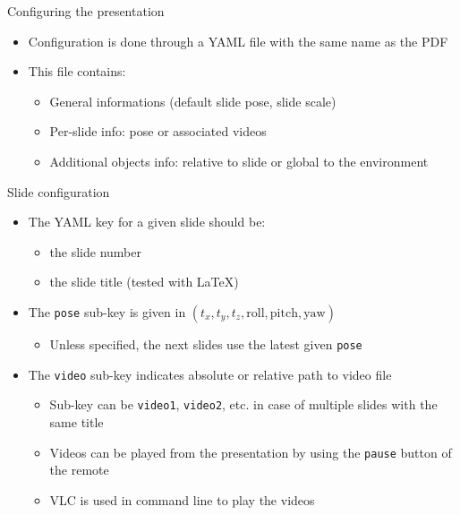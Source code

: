 \documentclass{ecnbeamer}
\begin{document}
\begin{frame}{Configuring the presentation}
 \begin{itemize}
  \item Configuration is done through a YAML file with the same name as the PDF\vfill
  \item This file contains:\vfill
  \begin{itemize}[<+->]
   \item General informations (default slide pose, slide scale)\vfill
   \item Per-slide info: pose or associated videos\vfill
   \item Additional objects info: relative to slide or global to the environment
  \end{itemize}
 \end{itemize}
\end{frame}

\begin{frame}{Slide configuration}
 \begin{itemize}
  \item The YAML key for a given slide should be:
  \begin{itemize}
   \item the slide number
   \item the slide title (tested with LaTeX)
  \end{itemize}\vfill
  \item The \texttt{pose} sub-key is given in $(t_x, t_y, t_z, \text{roll}, \text{pitch}, \text{yaw})$
  \begin{itemize}
   \item Unless specified, the next slides use the latest given \texttt{pose}
  \end{itemize}\vfill
  \item The \texttt{video} sub-key indicates absolute or relative path to video file
  \begin{itemize}
   \item Sub-key can be \texttt{video1}, \texttt{video2}, etc. in case of multiple slides with the same title
   \item Videos can be played from the presentation by using the \texttt{pause} button of the remote
   \item VLC is used in command line to play the videos
  \end{itemize}
 \end{itemize}
\end{frame}
\end{document}
